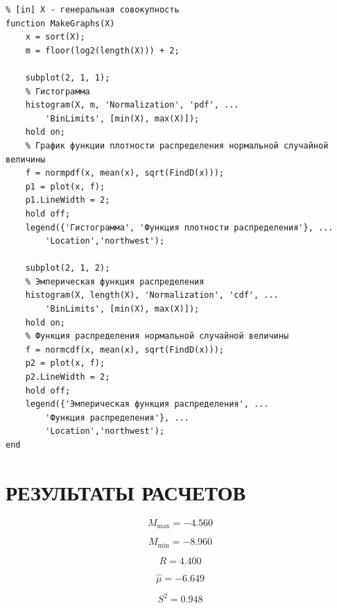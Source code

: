 \begin{lstlisting}[caption=Рисование графиков]
% Функция для рисования графиков
% [in] X - генеральная совокупность
function MakeGraphs(X)
    x = sort(X);
    m = floor(log2(length(X))) + 2;

    subplot(2, 1, 1);
    % Гистограмма
    histogram(X, m, 'Normalization', 'pdf', ...
        'BinLimits', [min(X), max(X)]);
    hold on;
    % График функции плотности распределения нормальной случайной величины
    f = normpdf(x, mean(x), sqrt(FindD(x)));
    p1 = plot(x, f);
    p1.LineWidth = 2;
    hold off;
    legend({'Гистограмма', 'Функция плотности распределения'}, ...
        'Location','northwest');

    subplot(2, 1, 2);
    % Эмперическая функция распределения
    histogram(X, length(X), 'Normalization', 'cdf', ...
        'BinLimits', [min(X), max(X)]);
    hold on;
    % Функция распределения нормальной случайной величины
    f = normcdf(x, mean(x), sqrt(FindD(x)));
    p2 = plot(x, f);
    p2.LineWidth = 2;
    hold off;
    legend({'Эмперическая функция распределения', ...
        'Функция распределения'}, ...
        'Location','northwest');
end
\end{lstlisting}

\section{РЕЗУЛЬТАТЫ РАСЧЕТОВ}

\begin{equation*}
    M_{\max} = -4.560
\end{equation*}

\begin{equation*}
    M_{\min} = -8.960
\end{equation*}

\begin{equation*}
    R = 4.400
\end{equation*}

\begin{equation*}
    \hat \mu = -6.649
\end{equation*}

\begin{equation*}
    S^2 = 0.948
\end{equation*}

